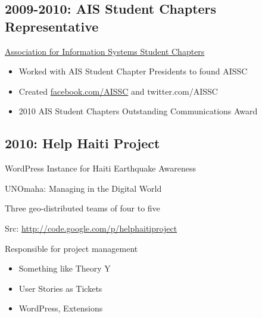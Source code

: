 \documentclass[letter,,openany,oneside]{sphinxhowto}
\begin{document}
\subsection{2009-2010: AIS Student Chapters Representative}
\label{resume:ais-student-chapters-representative}
\begin{DUlineblock}{0em}
\item[] \href{http://sc.aisnet.org/}{Association for Information Systems Student Chapters}
\end{DUlineblock}
\begin{itemize}
\item {} 
Worked with AIS Student Chapter Presidents to found AISSC

\item {} 
Created \href{https://www.facebook.com/AISSC}{facebook.com/AISSC} and
twitter.com/AISSC

\item {} 
2010 AIS Student Chapters Outstanding Communications Award

\end{itemize}


\subsection{2010: Help Haiti Project}
\label{resume:help-haiti-project}
\begin{DUlineblock}{0em}
\item[] WordPress Instance for Haiti Earthquake Awareness
\item[] UNOmaha: Managing in the Digital World
\item[] Three geo-distributed teams of four to five
\item[] Src: \url{http://code.google.com/p/helphaitiproject}
\end{DUlineblock}

Responsible for project management
\begin{itemize}
\item {} 
Something like Theory Y

\item {} 
User Stories as Tickets

\item {} 
WordPress, Extensions

\end{itemize}
\end{document}
